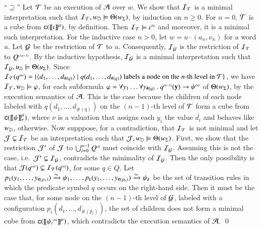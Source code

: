 \documentclass{llncs}
\begin{document}
{  ``$\supseteq$'' Let $\mathcal{T}$ be an execution of $\mathcal{A}$ over $w$. We show
  that $\mathcal{I}_{\mathcal{T}}$ is a minimal interpretation such that $\mathcal{I}_{\mathcal{T}},
  {w}_{\mathbb{D}} \models \Theta({{w}_\Sigma})$, by induction on $n \geq
  0$. For $n=0$, $\mathcal{T}$ is a cube from $\mathsf{c}({{\bf [\![} \iota {\bf ]\!]}^\mu})$, by
  definition. Then $\mathcal{I}_{\mathcal{T}} \models {\iota}^{\scriptscriptstyle{({0})}}$ and moreover, it
  is a minimal such interpretation. For the inductive case $n > 0$,
  let $w=u\cdot(a_n,\nu_n)$ for a word $u$. Let $\mathcal{G}$ be the
  restriction of $\mathcal{T}$ to $u$. Consequently, $\mathcal{I}_{\mathcal{G}}$ is the restriction
  of $\mathcal{I}_{\mathcal{T}}$ to ${Q}^{\scriptscriptstyle{({\leq n-1})}}$. By the inductive hypothesis,
  $\mathcal{I}_{\mathcal{G}}$ is a minimal interpretation such that \(\mathcal{I}_{\mathcal{G}}, u_{\mathbb{D}}
  \models \Theta({u_\Sigma})\). Since $\mathcal{I}_{\mathcal{T}}({q}^{\scriptscriptstyle{({n})}}) =
  \{ \langle d_1,\ldots,d_{\#(q)} \rangle \mid q(d_1,\ldots,d_{\#(q)})
    \text{ labels a node on the $n$-th level in $\mathcal{T}$} \}$, we have $\mathcal{I}_{\mathcal{T}},
  {w}_{\mathbb{D}} \models \varphi$, for each subformula $\varphi = \forall y_1
  \ldots \forall y_{\#(q)} ~.~ {q}^{\scriptscriptstyle{({n-1})}}(\mathbf y)
  \rightarrow {\psi}^{\scriptscriptstyle{({n})}}$ of $\Theta({{w}_\Sigma})$, by the
  execution semantics of $\mathcal{A}$. This is the case because the children
  of each node labeled with $q(d_1,\ldots,d_{\#(q)})$ on the
  $(n-1)$-th level of $\mathcal{T}$ form a cube from
  $\mathsf{c}({{\bf [\![} \psi {\bf ]\!]}^\mu_\nu})$, where $\nu$ is a valuation that assigns
  each $y_i$ the value $d_i$ and behaves like ${w}_{\mathbb{D}}$,
  otherwise. Now supppose, for a contradiction, that $\mathcal{I}_{\mathcal{T}}$ is not
  minimal and let $\mathcal{J} \subsetneq \mathcal{I}_{\mathcal{T}}$ be an interpretation such
  that $\mathcal{J},{w}_{\mathbb{D}} \models \Theta({{w}_\Sigma})$. First, we show that
  the restriction $\mathcal{J}'$ of $\mathcal{J}$ to $\bigcup_{i=0}^{n-1} {Q}^{\scriptscriptstyle{({i})}}$
  must coincide with $\mathcal{I}_{\mathcal{G}}$. Assuming this is not the case,
  i.e.\ $\mathcal{J}' \subsetneq \mathcal{I}_{\mathcal{G}}$, contradicts the minimality of
  $\mathcal{I}_{\mathcal{G}}$. Then the only possibility is that $\mathcal{J}({q}^{\scriptscriptstyle{({n})}})
  \subsetneq \mathcal{I}_{\mathcal{T}}({q}^{\scriptscriptstyle{({n})}})$, for some $q \in Q$. Let
  $p_1(y_1,\ldots,y_{\#(p_1)}) \xrightarrow{{\scriptscriptstyle a_n}}_{{\scriptstyle }} \psi_1, \ldots,
  p_k(y_1,\ldots,y_{\#(p_k)}) \xrightarrow{{\scriptscriptstyle a_n}}_{{\scriptstyle }} \psi_k$ be the set of
  transition rules in which the predicate symbol $q$ occurs on the
  right-hand side. Then it must be the case that, for some node on the
  $(n-1)$-th level of $\mathcal{G}$, labeled with a configuration
  $p_i(d_1,\ldots,d_{\#(p_i)})$, the set of children does not form a
  minimal cube from $\mathsf{c}({{\bf [\![} {\psi_i}^{\scriptscriptstyle{({n})}} {\bf ]\!]}^\mu})$, which
  contradicts the execution semantics of $\mathcal{A}$. \qed}
\end{document}
